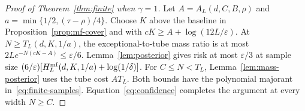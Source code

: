 \begin{proof}[Proof of Theorem~\ref{thm:finite} when $\gamma=1$]
Let $A=A_L(d,C,B,\rho)$ and $a=\min\{1/2,(\tau-\rho)/4\}$.
Choose $K$ above the baseline in Proposition~\ref{prop:mf-cover} and with
$cK\geq A+\log(12L/\varepsilon)$. At $N\geq T_L(d,K,1/a)$,
the exceptional-to-tube mass ratio is at most
$2Le^{-N(cK-A)}\leq\varepsilon/6$. Lemma~\ref{lem:posterior}
gives risk at most $\varepsilon/3$ at sample size
$(6/\varepsilon)[H_L^{\rm mf}(d,K,1/a)+\log(1/\delta)]$.
For $C\leq N<T_L$, Lemma~\ref{lem:mass-posterior} uses the tube
cost $AT_L$. Both bounds have the polynomial majorant
in~\eqref{eq:finite-samples}. Equation~\eqref{eq:confidence} completes
the argument at every width $N\geq C$.
\end{proof}
